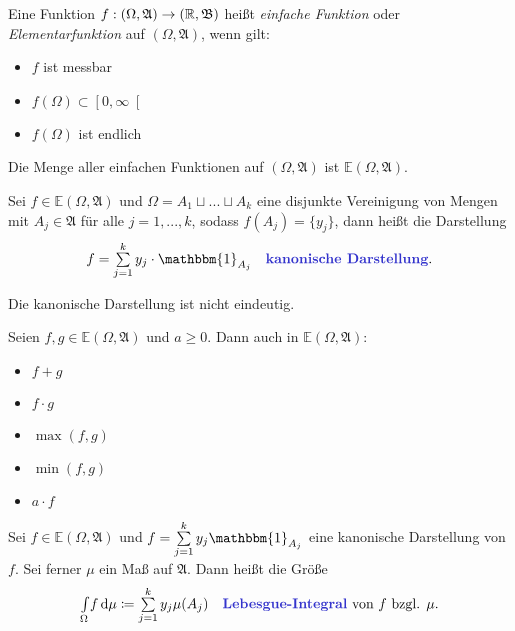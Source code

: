 \documentclass{cheat-sheet}
\newcommand{\Alg}{\mathfrak{A}} %
\newcommand{\Bor}{\mathfrak{B}} %
\newcommand{\E}{\mathbb{E}} %
\newcommand{\ind}{\mathbbm{1}} %
\theoremstyle{definition}
\newcommand{\IntOmu}[1]{\Int{\Omega}{}{#1}{\mu}} %
\begin{document}
\begin{defn}
  Eine Funktion $f : (\Omega, \Alg) \to (\R, \Bor)$ heißt \emph{einfache Funktion} oder \emph{Elementarfunktion} auf $(\Omega, \Alg)$, wenn gilt:
  \begin{multicols}{3}
    \begin{itemize}
      \item $f$ ist messbar
      \item $f(\Omega) \subset \left[0, \infty\right[$
      \item $f(\Omega)$ ist endlich
    \end{itemize}
  \end{multicols}
  Die Menge aller einfachen Funktionen auf $(\Omega, \Alg)$ ist $\E(\Omega, \Alg)$.
\end{defn}

\begin{defn}
  Sei $f \in \E(\Omega, \Alg)$ und $\Omega = A_1 \sqcup ... \sqcup A_k$ eine disjunkte Vereinigung von Mengen mit $A_j \in \Alg$ für alle $j = 1, ..., k$, sodass $f(A_j) = \{ y_j \}$, dann heißt die Darstellung
  \[ f = \sum_{j=1}^k y_j \cdot \ind_{A_j} \quad \text{\emph{kanonische Darstellung}.} \]
\end{defn}

\begin{bem}
  Die kanonische Darstellung ist nicht eindeutig.
\end{bem}

\begin{satz}
  Seien $f, g \in \E(\Omega, \Alg)$ und $a \geq 0$. Dann auch in $\E(\Omega, \Alg)$:
  \begin{multicols}{5}
    \begin{itemize}
      \item $f + g$
      \item $f \cdot g$
      \item $\max(f, g)$
      \item $\min(f, g)$
      \item $a \cdot f$
    \end{itemize}
  \end{multicols}
\end{satz}

\begin{defn}
  Sei $f \in \E(\Omega, \Alg)$ und $\textstyle f = \sum_{j=1}^k y_j \ind_{A_j}$ eine kanonische Darstellung von $f$. Sei ferner $\mu$ ein Maß auf $\Alg$. Dann heißt die Größe
  \[ \IntOmu{f} \coloneqq \sum_{j=1}^k y_j \mu(A_j) \quad \text{\emph{Lebesgue-Integral} von $f$ bzgl. $\mu$.} \]
\end{defn}
\end{document}
